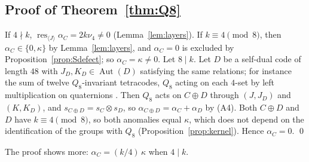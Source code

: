 \documentclass[11pt]{amsart}
\theoremstyle{definition}
\newcommand{\Aut}{\operatorname{Aut}}
\newcommand{\res}{\operatorname{res}}
\begin{document}
\subsection{Proof of Theorem~\ref{thm:Q8}}
If $4\nmid k$, $\res_{\langle J\rangle}\alpha_C=2k\nu_4\ne0$ (Lemma~\ref{lem:layers}). If $k\equiv4\pmod8$,
then $\alpha_C\in\{0,\kappa\}$ by Lemma~\ref{lem:layers}, and $\alpha_C=0$ is excluded by
Proposition~\ref{prop:Sdefect}; so $\alpha_C=\kappa\ne0$. Let $8\mid k$. Let $D$ be a self-dual code of
length $48$ with $J_D,K_D\in\Aut(D)$ satisfying the same relations; for instance the sum of twelve
$Q_8$-invariant tetracodes, $Q_8$ acting on each $4$-set by left multiplication on quaternions
\cite[Lemma~6.2]{I}. Then $Q_8$ acts on $C\oplus D$ through $(J,J_D)$ and $(K,K_D)$, and
$s_{C\oplus D}=s_C\otimes s_D$, so $\alpha_{C\oplus D}=\alpha_C+\alpha_D$ by (A4). Both $C\oplus D$ and
$D$ have $k\equiv4\pmod8$, so both anomalies equal $\kappa$, which does not depend on the identification
of the groups with $Q_8$ (Proposition~\ref{prop:kernel}). Hence $\alpha_C=0$. \qed

\medskip
The proof shows more: $\alpha_C=(k/4)\,\kappa$ when $4\mid k$.
\end{document}
